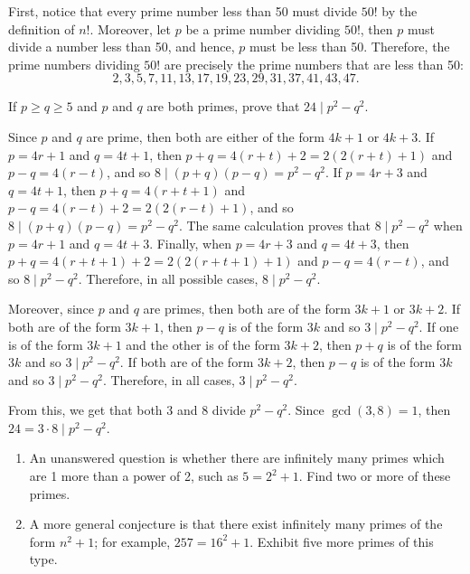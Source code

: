\begin{solution}
    First, notice that every prime number less than 50 must divide $50!$ by the definition of $n!$. Moreover, let $p$ be a prime number dividing $50!$, then $p$ must divide a number less than 50, and hence, $p$ must be less than 50. Therefore, the prime numbers dividing $50!$ are precisely the prime numbers that are less than 50:
    $$2,3,5,7,11,13,17,19,23,29,31,37,41,43,47.$$
\end{solution}

\begin{exercise}
    If $p \geq q \geq 5$ and $p$ and $q$ are both primes, prove that $24 \mid p^2 - q^2$. \\
\end{exercise}

\begin{solution}
    Since $p$ and $q$ are prime, then both are either of the form $4k+1$ or $4k+3$. If $p = 4r+1$ and $q = 4t + 1$, then $p + q = 4(r+t) + 2 = 2(2(r+t) + 1)$ and $p - q = 4(r - t)$, and so $8 \mid (p+q)(p-q) = p^2 - q^2$. If $p = 4r+3$ and $q = 4t + 1$, then $p + q = 4(r+t + 1)$ and $p - q = 4(r - t) + 2 = 2(2(r-t) + 1)$, and so $8 \mid (p+q)(p-q) = p^2 - q^2$. The same calculation proves that $8 \mid p^2 - q^2$ when $p = 4r+1$ and $q = 4t + 3$. Finally, when $p = 4r+3$ and $q = 4t + 3$, then $p + q = 4(r+t + 1) + 2 = 2(2(r+t+1) + 1)$ and $p - q = 4(r-t)$, and so $8 \mid p^2 - q^2$. Therefore, in all possible cases, $8 \mid p^2 - q^2$.

    Moreover, since $p$ and $q$ are primes, then both are of the form $3k+1$ or $3k+2$. If both are of the form $3k+1$, then $p-q$ is of the form $3k$ and so $3 \mid p^2 - q^2$. If one is of the form $3k+1$ and the other is of the form $3k+2$, then $p + q$ is of the form $3k$ and so $3 \mid p^2 - q^2$. If both are of the form $3k+2$, then $p-q$ is of the form $3k$ and so $3 \mid p^2 - q^2$. Therefore, in all cases, $3 \mid p^2 - q^2$. 

    From this, we get that both 3 and 8 divide $p^2 - q^2$. Since $\gcd(3,8) = 1$, then $24 = 3 \cdot 8 \mid p^2 - q^2$. \\
\end{solution}

\begin{exercise}
    \begin{enumerate}
        \item An unanswered question is whether there are infinitely many primes which are 1 more than a power of 2, such as $5 = 2^2 + 1$. Find two or more of these primes.
        \item A more general conjecture is that there exist infinitely many primes of the form $n^2 + 1$; for example, $257 = 16^2 + 1$. Exhibit five more primes of this type.
    \end{enumerate}
\end{exercise}

